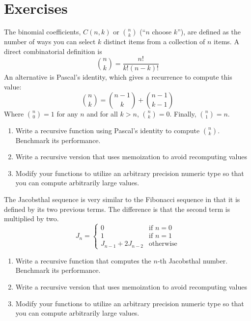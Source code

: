 

\section{Exercises}

\begin{exer}
The binomial coefficients, $C(n,k)$ or ${n \choose k}$ (``$n$ choose
$k$''), are defined as the number of ways you can select $k$ distinct
items from a collection of $n$ items.  A direct combinatorial
definition is
$${n \choose k} = \frac{n!}{k!(n-k)!}$$
An alternative is Pascal's identity, which gives a recurrence to
compute this value:
$${n \choose k} = {n-1 \choose k} + {n-1 \choose k-1}$$
Where ${n \choose 0} = 1$ for any $n$ and for all $k > n$, ${n\choose
k} = 0$. Finally, ${n \choose 1} = n$.
\begin{enumerate}
  \item Write a recursive function using Pascal's identity to compute
  	${n \choose k}$.  Benchmark its performance.
  \item Write a recursive version that uses memoization to avoid 
  	recomputing values
  \item Modify your functions to utilize an arbitrary precision 
  	numeric type so that you can compute arbitrarily large values.
\end{enumerate}
\end{exer}

\begin{exer}
The Jacobsthal sequence is very similar to the Fibonacci sequence 
in that it is defined by its two previous terms.  The difference is that 
the second term is multiplied by two.  
$$J_n = \left\{
\begin{array}{ll}
0 & \textrm{if } n = 0 \\
1 & \textrm{if } n = 1 \\
J_{n-1} + 2J_{n-2} & \textrm{otherwise}
\end{array}
\right.$$

\begin{enumerate}
  \item Write a recursive function that computes the $n$-th Jacobsthal
    number.  Benchmark its performance.
  \item Write a recursive version that uses memoization to avoid 
  	recomputing values
  \item Modify your functions to utilize an arbitrary precision 
  	numeric type so that you can compute arbitrarily large values.
\end{enumerate}
\end{exer}


